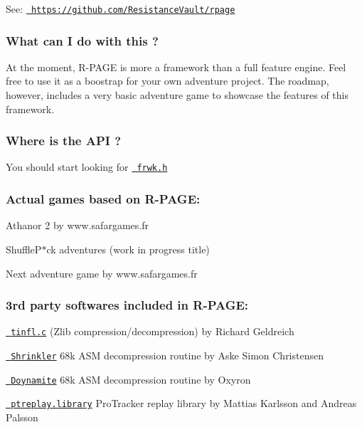 See\+: \href{https://github.com/ResistanceVault/rpage}{\texttt{ https\+://github.\+com/\+Resistance\+Vault/rpage}}

\subsubsection*{What can I do with this ?}

At the moment, R-\/\+P\+A\+GE is more a framework than a full feature engine. Feel free to use it as a boostrap for your own adventure project. The roadmap, however, includes a very basic adventure game to showcase the features of this framework.

\subsubsection*{Where is the A\+PI ?}

You should start looking for \href{frwk_8h.html}{\texttt{ frwk.\+h}}

\subsubsection*{Actual games based on R-\/\+P\+A\+GE\+:}


\begin{DoxyItemize}
\item Athanor 2 by www.\+safargames.\+fr
\item Shuffle\+P$\ast$ck adventures (work in progress title)
\item Next adventure game by www.\+safargames.\+fr
\end{DoxyItemize}

\subsubsection*{3rd party softwares included in R-\/\+P\+A\+GE\+:}


\begin{DoxyItemize}
\item \href{https://github.com/richgel999/miniz}{\texttt{ tinfl.\+c}} (Zlib compression/decompression) by Richard Geldreich
\item \href{https://github.com/askeksa/Shrinkler}{\texttt{ Shrinkler}} 68k A\+SM decompression routine by Aske Simon Christensen
\item \href{https://github.com/AxisOxy/Planet-Rocklobster}{\texttt{ Doynamite}} 68k A\+SM decompression routine by Oxyron
\item \href{http://aminet.net/package/mus/play/ptreplay66}{\texttt{ ptreplay.\+library}} Pro\+Tracker replay library by Mattias Karlsson and Andreas Palsson
\end{DoxyItemize}


